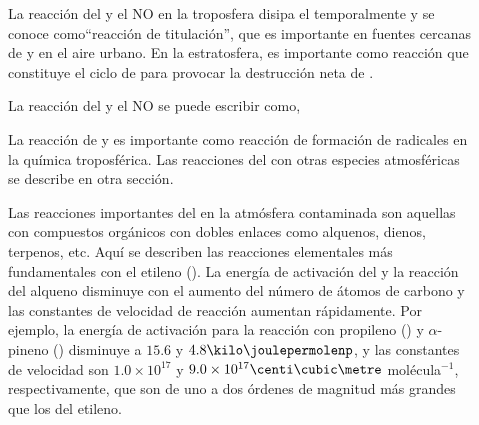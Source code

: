 {\begin{description}
\item[ ]
La reacción del  y el NO en la troposfera disipa el  temporalmente y se conoce como``reacción de titulación'', que es importante en fuentes cercanas de  y en el aire urbano. En la estratosfera, es importante como reacción que constituye  el ciclo de  para provocar la destrucción neta de .

La reacción del  y el NO se puede escribir como,
\item[ ]
La reacción de  y  es importante como reacción de formación de radicales  en la química troposférica. Las reacciones del  con otras especies atmosféricas se describe en otra sección.

\item[ ]
Las reacciones importantes del   en la atmósfera contaminada son aquellas con compuestos orgánicos con dobles enlaces como alquenos, dienos, terpenos, etc. Aquí se describen las reacciones elementales más fundamentales con el etileno ().
La energía de activación del  y la reacción del alqueno disminuye con el aumento del número de átomos de carbono y las constantes de velocidad de reacción aumentan rápidamente. Por ejemplo, la energía de activación para la reacción con propileno () y $\alpha$-pineno () disminuye a $15.6$ y $4.8\kilo\joulepermolenp$, y las constantes de velocidad son $1.0\times10^{17}$ y $9.0\times10^{17}\centi\cubic\metre$ molécula$^{-1}$, respectivamente, que son de uno a dos órdenes de magnitud más grandes que los del etileno.


\end{description}}
